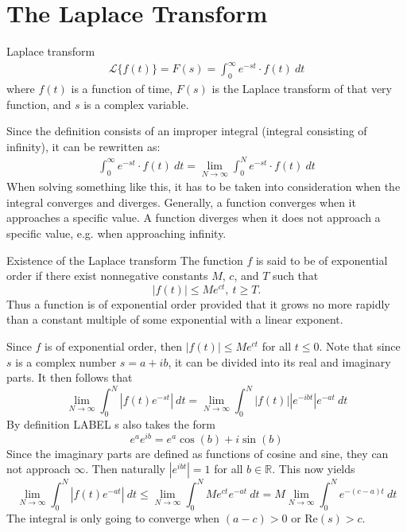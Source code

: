 \section{The Laplace Transform}
\begin{definition}{Laplace transform}{}
\begin{align}
\mathcal{L}\{f(t)\}=F(s)=\int_{0}^{\infty} e^{-st}\cdot f(t)\ dt
\end{align} \label{lpdef}
where $f(t)$ is a function of time, $F(s)$ is the Laplace transform of that very function, and $s$ is a complex variable.
\end{definition}
Since the definition consists of an improper integral (integral consisting of infinity), it can be rewritten as:
\begin{align}
\int_{0}^{\infty} e^{-st}\cdot f(t)\ dt = \lim_{N \to \infty} \int_{0}^{N} e^{-st}\cdot f(t)\ dt
\end{align}
When solving something like this, it has to be taken into consideration when the integral converges and diverges. Generally, a function converges when it approaches a specific value. A function diverges when it does not approach a specific value, e.g. when approaching infinity.

\begin{theorem}{Existence of the Laplace transform}{}
The function $f$ is said to be of exponential order if there exist nonnegative constants $M$, $c$, and $T$  such that $$|f(t)| \leq Me^{ct}, \ t \geq T.$$
Thus a function is of exponential order provided that it grows no more rapidly than a constant multiple of some exponential with a linear exponent. \cite[p. 320]{diffandcomplex}
\end{theorem}
\begin{prof}{}{}
Since $f$ is of exponential order, then $|f(t)| \leq Me^{ct}$ for all $t \leq 0$. Note that since $s$ is a complex number  $s=a+ib$, it can be divided into its real and imaginary parts. It then follows that $$\lim_{N \to \infty} \int_{0}^{N} |f(t)e^{-st}|\ dt = \lim_{N \to \infty} \int_{0}^{N} |f(t)| |e^{-ibt}|e^{-at}\ dt$$
By definition LABEL s also takes the form $$e^{a}e^{ib}= e^{a}\cos(b)+i\sin(b)$$
Since the imaginary parts are defined as functions of cosine and sine, they can not approach $\infty$. Then naturally $|e^{ibt}|=1$ for all $b \in \mathbb{R}$. This now yields $$\lim_{N \to \infty} \int_{0}^{N} |f(t)e^{-at}|\ dt \leq \lim_{N \to \infty} \int_{0}^{N} Me^{ct}e^{-at}\ dt = M \lim_{N \to \infty} \int_{0}^{N}e^{-(c-a)t}\ dt $$ The integral is only going to converge when $(a-c)>0$ or Re$(s)>c$.
\end{prof}


